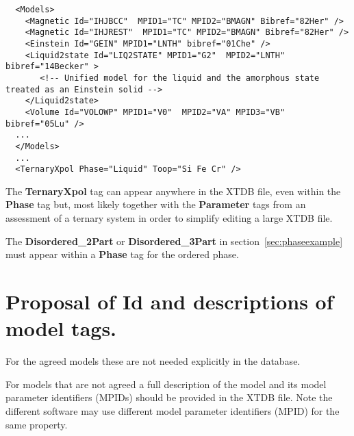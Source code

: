 \documentclass{article}
\begin{document}
\begin{appendices}
{\small
\begin{verbatim}
  <Models>
    <Magnetic Id="IHJBCC"  MPID1="TC" MPID2="BMAGN" Bibref="82Her" />
    <Magnetic Id="IHJREST"  MPID1="TC" MPID2="BMAGN" Bibref="82Her" />
    <Einstein Id="GEIN" MPID1="LNTH" bibref="01Che" /> 
    <Liquid2state Id="LIQ2STATE" MPID1="G2"  MPID2="LNTH" bibref="14Becker" >
       <!-- Unified model for the liquid and the amorphous state treated as an Einstein solid -->
    </Liquid2state>
    <Volume Id="VOLOWP" MPID1="V0"  MPID2="VA" MPID3="VB" bibref="05Lu" />
  ...
  </Models>
  ...
  <TernaryXpol Phase="Liquid" Toop="Si Fe Cr" />
\end{verbatim}
}

The {\bf TernaryXpol} tag can appear anywhere in the XTDB file, even
within the {\bf Phase} tag but, most likely together with the {\bf
  Parameter} tags from an assessment of a ternary system in order to
simplify editing a large XTDB file.  

The {\bf Disordered\_2Part} or {\bf Disordered\_3Part} in
section~\ref{sec:phaseexample} must appear within a {\bf Phase} tag
for the ordered phase.

\newpage 

\setcounter{equation}{0}
\renewcommand{\theequation}{B\arabic{equation}}
\setcounter{figure}{0}
\renewcommand{\thefigure}{B\arabic{figure}}

\section{Proposal of Id and descriptions of model tags.}\label{sec:modelapp}

For the agreed models these are not needed explicitly in the database.

For models that are not agreed a full description of the model and its
model parameter identifiers (MPIDs) should be provided in the XTDB
file.  Note the different software may use different model parameter
identifiers (MPID) for the same property.


\end{appendices}
\end{document}
